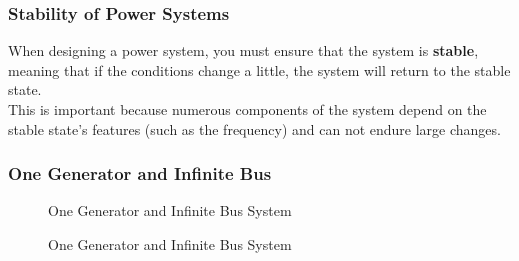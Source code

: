 \documentclass[12pt,English]{article}
\begin{document}
\subsubsection{Stability of Power Systems}
When designing a power system, you must ensure that the system is \textbf{stable}, meaning that if the conditions change a little, the system will return to the stable state. \\
This is important because numerous components of the system depend on the stable state's features (such as the frequency) and can not endure large changes.  


\subsubsection{One Generator and Infinite Bus}

\begin{figure}[H]
\begin{center}

\end{center}
\caption{One Generator and Infinite Bus System}
\end{figure}

\begin{figure}[H]
\begin{center}

\end{center}
\caption{One Generator and Infinite Bus System}
\end{figure}

\end{document}
